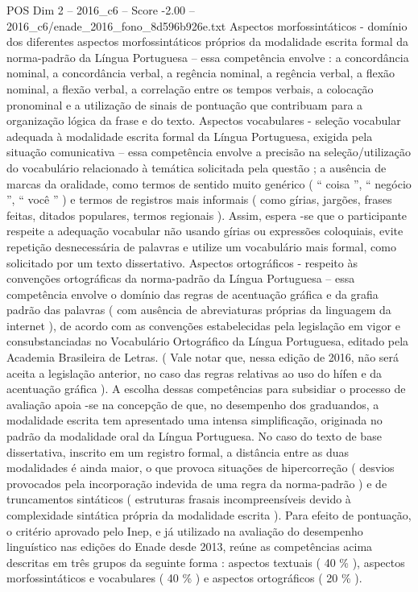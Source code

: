 \begin{textsample}{POS Dim 2 – 2016\_c6 – Score -2.00 – 2016\_c6/enade\_2016\_fono\_8d596b926e.txt}
Aspectos morfossintáticos - domínio dos diferentes aspectos morfossintáticos próprios da modalidade escrita formal da norma-padrão da Língua Portuguesa – essa competência envolve : a concordância nominal, a concordância verbal, a regência nominal, a regência verbal, a flexão nominal, a flexão verbal, a correlação entre os tempos verbais, a colocação pronominal e a utilização de sinais de pontuação que contribuam para a organização lógica da frase e do texto.
Aspectos vocabulares - seleção vocabular adequada à modalidade escrita formal da Língua Portuguesa, exigida pela situação comunicativa – essa competência envolve a precisão na seleção/utilização do vocabulário relacionado à temática solicitada pela questão ; a ausência de marcas da oralidade, como termos de sentido muito genérico ( “ coisa ”, “ negócio ”, “ você ” ) e termos de registros mais informais ( como gírias, jargões, frases feitas, ditados populares, termos regionais ).
Assim, espera -se que o participante respeite a adequação vocabular não usando gírias ou expressões coloquiais, evite repetição desnecessária de palavras e utilize um vocabulário mais formal, como solicitado por um texto dissertativo.
Aspectos ortográficos - respeito às convenções ortográficas da norma-padrão da Língua Portuguesa – essa competência envolve o domínio das regras de acentuação gráfica e da grafia padrão das palavras ( com ausência de abreviaturas próprias da linguagem da internet ), de acordo com as convenções estabelecidas pela legislação em vigor e consubstanciadas no Vocabulário Ortográfico da Língua Portuguesa, editado pela Academia Brasileira de Letras. ( Vale notar que, nessa edição de 2016, não será aceita a legislação anterior, no caso das regras relativas ao uso do hífen e da acentuação gráfica ).
A escolha dessas competências para subsidiar o processo de avaliação apoia -se na concepção de que, no desempenho dos graduandos, a modalidade escrita tem apresentado uma intensa simplificação, originada no padrão da modalidade oral da Língua Portuguesa.
No caso do texto de base dissertativa, inscrito em um registro formal, a distância entre as duas modalidades é ainda maior, o que provoca situações de hipercorreção ( desvios provocados pela incorporação indevida de uma regra da norma-padrão ) e de truncamentos sintáticos ( estruturas frasais incompreensíveis devido à complexidade sintática própria da modalidade escrita ).
Para efeito de pontuação, o critério aprovado pelo Inep, e já utilizado na avaliação do desempenho linguístico nas edições do Enade desde 2013, reúne as competências acima descritas em três grupos da seguinte forma : aspectos textuais ( 40 \% ), aspectos morfossintáticos e vocabulares ( 40 \% ) e aspectos ortográficos ( 20 \% ).

\end{textsample}
